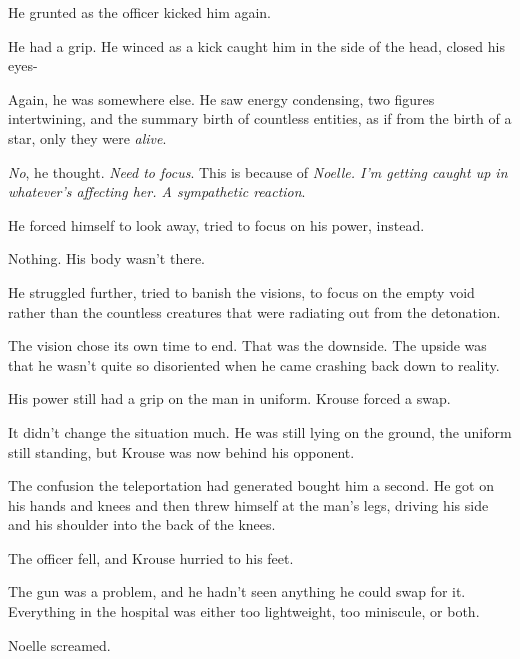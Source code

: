 He grunted as the officer kicked him again.



He had a grip.  He winced as a kick caught him in the side of the head, closed his eyes-



Again, he was somewhere else.  He saw energy condensing, two figures intertwining, and the summary birth of countless entities, as if from the birth of a star, only they were \emph{alive}.



\emph{No}, he thought.  \emph{Need to focus}.  This is because of \emph{Noelle.  I'm getting caught up in whatever's affecting her.  A sympathetic reaction}.



He forced himself to look away, tried to focus on his power, instead.



Nothing.  His body wasn't there.



He struggled further, tried to banish the visions, to focus on the empty void rather than the countless creatures that were radiating out from the detonation.



The vision chose its own time to end.  That was the downside.  The upside was that he wasn't quite so disoriented when he came crashing back down to reality.



His power still had a grip on the man in uniform.  Krouse forced a swap.



It didn't change the situation much.  He was still lying on the ground, the uniform still standing, but Krouse was now behind his opponent.



The confusion the teleportation had generated bought him a second.  He got on his hands and knees and then threw himself at the man's legs, driving his side and his shoulder into the back of the knees.



The officer fell, and Krouse hurried to his feet.



The gun was a problem, and he hadn't seen anything he could swap for it.  Everything in the hospital was either too lightweight, too miniscule, or both.



Noelle screamed.




